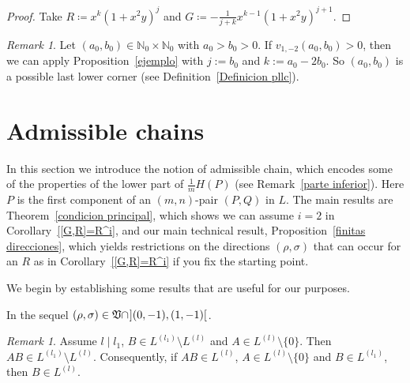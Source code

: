 \documentclass[reqno,a4paper]{amsart}
\theoremstyle{definition}
\theoremstyle{remark}
\newtheorem{remark}[theorem]{Remark}
\begin{document}
\begin{proof} Take $R\coloneqq x^k(1+x^2 y)^j$ and $G\coloneqq -\frac{1}{j+k}x^{k-1}(1+x^2 y)^{j+1}$.
\end{proof}

\begin{remark}\label{condicion para v sub rho sigma1} Let $(a_0,b_0)\in\mathds{N}_0\times \mathds{N}_0$ with $a_0>b_0>0$. If $v_{1,-2}(a_0,b_0)>0$, then we can apply Proposition~\ref{ejemplo} with $j:=b_0$ and $k:=a_0-2b_0$. So $(a_0,b_0)$ is a possible last lower corner (see Definition~\ref{Definicion pllc}).
\end{remark}

\section{Admissible chains}

In this section we introduce the notion of admissible chain, which encodes some of the properties of the lower part of $\frac{1}{m}H(P)$ (see Remark~\ref{parte inferior}). Here $P$ is the first component of an $(m,n)$-pair $(P,Q)$ in $L$. The main results are Theorem~\ref{condicion principal}, which shows we can assume $i=2$ in Corollary~\ref{[G,R]=R^i}, and our main technical result, Proposition~\ref{finitas direcciones}, which yields restrictions on the directions $(\rho,\sigma)$ that can occur for an $R$ as in Corollary~\ref{[G,R]=R^i} if you fix the starting point.

We begin by establishing some results that are useful for our purposes.

In the sequel $(\rho,\sigma)\in\mathfrak{V}\cap \hspace{0.7pt}](0,-1),(1,-1)[\hspace{0.7pt}$.

\begin{remark}\label{clausura integral} Assume $l\mid l_1$, $B\in L^{(l_1)}\setminus L^{(l)}$ and $A\in L^{(l)}\setminus \{0\}$. Then $AB\in L^{(l_1)}\setminus L^{(l)}$. Consequently, if $AB\in L^{(l)}$, $A\in L^{(l)}\setminus \{0\}$ and $B\in L^{(l_1)}$, then $B\in L^{(l)}$.
\end{remark}
\end{document}
